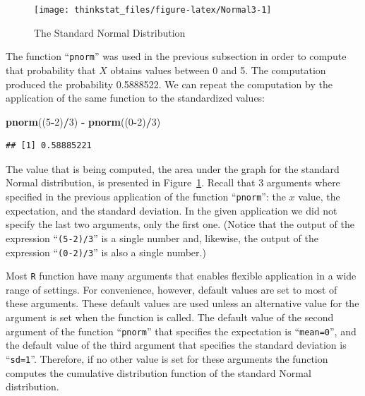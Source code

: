 \documentclass[]{krantz}
\makeatletter
\newenvironment{Shaded}{\begin{snugshade}}{\end{snugshade}}
\newcommand{\KeywordTok}[1]{\textcolor[rgb]{0.13,0.29,0.53}{\textbf{#1}}}
\newcommand{\DecValTok}[1]{\textcolor[rgb]{0.00,0.00,0.81}{#1}}
\newcommand{\StringTok}[1]{\textcolor[rgb]{0.31,0.60,0.02}{#1}}
\newcommand{\OperatorTok}[1]{\textcolor[rgb]{0.81,0.36,0.00}{\textbf{#1}}}
\newcommand{\NormalTok}[1]{#1}
\newenvironment{kframe}{%
\medskip{}
\setlength{\fboxsep}{.8em}
 \def\at@end@of@kframe{}%
 \ifinner\ifhmode%
  \def\at@end@of@kframe{\end{minipage}}%
  \begin{minipage}{\columnwidth}%
 \fi\fi%
 \def\FrameCommand##1{\hskip\@totalleftmargin \hskip-\fboxsep
 \colorbox{shadecolor}{##1}\hskip-\fboxsep
     \hskip-\linewidth \hskip-\@totalleftmargin \hskip\columnwidth}%
 \MakeFramed {\advance\hsize-\width
   \@totalleftmargin\z@ \linewidth\hsize
   \@setminipage}}%
 {\par\unskip\endMakeFramed%
 \at@end@of@kframe}
\renewenvironment{Shaded}{\begin{kframe}}{\end{kframe}}
\theoremstyle{definition}
\theoremstyle{definition}
\theoremstyle{definition}
\theoremstyle{remark}
\makeatother
\begin{document}
\begin{figure}

{\centering \texttt{[image: thinkstat\_files/figure-latex/Normal3-1]} 

}

\caption{The Standard Normal Distribution}\label{fig:Normal3}
\end{figure}

The function ``\texttt{pnorm}'' was used in the previous subsection in
order to compute that probability that \(X\) obtains values between 0
and 5. The computation produced the probability 0.5888522. We can repeat
the computation by the application of the same function to the
standardized values:

\begin{Shaded}
\begin{Highlighting}[]
\KeywordTok{pnorm}\NormalTok{((}\DecValTok{5}\OperatorTok{-}\DecValTok{2}\NormalTok{)}\OperatorTok{/}\DecValTok{3}\NormalTok{) }\OperatorTok{-}\StringTok{ }\KeywordTok{pnorm}\NormalTok{((}\DecValTok{0}\OperatorTok{-}\DecValTok{2}\NormalTok{)}\OperatorTok{/}\DecValTok{3}\NormalTok{)}
\end{Highlighting}
\end{Shaded}

\begin{verbatim}
## [1] 0.58885221
\end{verbatim}

The value that is being computed, the area under the graph for the
standard Normal distribution, is presented in Figure~\ref{fig:Normal3}.
Recall that 3 arguments where specified in the previous application of
the function ``\texttt{pnorm}'': the \(x\) value, the expectation, and
the standard deviation. In the given application we did not specify the
last two arguments, only the first one. (Notice that the output of the
expression ``\texttt{(5-2)/3}'' is a single number and, likewise, the
output of the expression ``\texttt{(0-2)/3}'' is also a single number.)

Most \texttt{R} function have many arguments that enables flexible
application in a wide range of settings. For convenience, however,
default values are set to most of these arguments. These default values
are used unless an alternative value for the argument is set when the
function is called. The default value of the second argument of the
function ``\texttt{pnorm}'' that specifies the expectation is
``\texttt{mean=0}'', and the default value of the third argument that
specifies the standard deviation is ``\texttt{sd=1}''. Therefore, if no
other value is set for these arguments the function computes the
cumulative distribution function of the standard Normal distribution.
\end{document}
